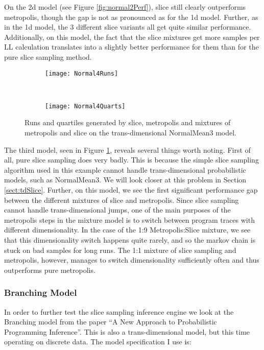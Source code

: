 On the 2d model (see Figure \ref{fig:normal2Perf}), slice still clearly outperforms metropolis, though the gap is not as pronounced as for the 1d model. Further, as in the 1d model, the 3 different slice variants all get quite similar performance. Additionally, on this model, the fact that the slice mixtures get more samples per LL calculation translates into a slightly better performance for them than for the pure slice sampling method.

\begin{figure}[h]
        \centering
        \begin{subfigure}[b]{0.48\textwidth}
                \centering
                \texttt{[image: Normal4Runs]}
        \end{subfigure}
        ~ 
        \begin{subfigure}[b]{0.48\textwidth}
                \centering
                \texttt{[image: Normal4Quarts]}
        \end{subfigure}
    \caption{Runs and quartiles generated by slice, metropolis and mixtures of metropolis and slice on the trans-dimensional NormalMean3 model.}
    \label{fig:normal4Perf}
\end{figure}

The third model, seen in Figure \ref{fig:normal4Perf}, reveals several things worth noting. First of all, pure slice sampling does very badly. This is because the simple slice sampling algorithm used in this example cannot handle trans-dimensional probabilistic models, such as NormalMean3. We will look closer at this problem in Section \ref{sect:tdSlice}. Further, on this model, we see the first significant performance gap between the different mixtures of slice and metropolis. Since slice sampling cannot handle trans-dimensional jumps, one of the main purposes of the metropolis steps in the mixture model is to switch between program traces with different dimensionality. In the case of the 1:9 Metropolis:Slice mixture, we see that this dimensionality switch happens quite rarely, and so the markov chain is stuck on bad samples for long runs. The 1:1 mixture of slice sampling and metropolis, however, manages to switch dimensionality sufficiently often and thus outperforms pure metropolis.

\subsubsection{Branching Model}
\label{sect:branching}
In order to further test the slice sampling inference engine we look at the Branching model from the paper ``A New Approach to Probabilistic Programming Inference''. This is also a trans-dimensional model, but this time operating on discrete data.  The model specification I use is:

